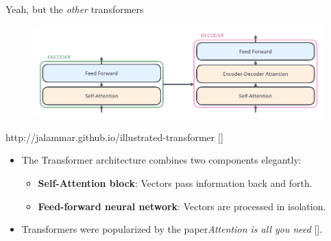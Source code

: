 \documentclass[10pt]{beamer}
\newcommand{\credit}[1]{{\par \raggedleft \scriptsize \mdseries \color{mDarkBrown} #1 \par}}
\newcommand{\citeme}[1]{{\xspace\color{scAqua} \scriptsize [\cite{#1}]}}
\newcommand{\feature}[1]{{\color{scLime} \textbf{#1}}}
\begin{document}
\begin{frame}{Yeah, but the \emph{other} transformers}
	\begin{figure}
		\includegraphics[width=\textwidth]{figures/Transformer_decoder.png}
	\end{figure}
	\credit{http://jalammar.github.io/illustrated-transformer \citeme{Alammar2018}}
	\begin{itemize}
		\item The Transformer architecture combines two components elegantly:
		\begin{itemize}
			\item \feature{Self-Attention block}: Vectors pass information back and forth.
			\item \feature{Feed-forward neural network}: Vectors are processed in isolation.
		\end{itemize}
	\item Transformers were popularized by the paper\emph{Attention is all you need}\citeme{Vaswani2017}.
	\end{itemize}
\end{frame}
\end{document}
